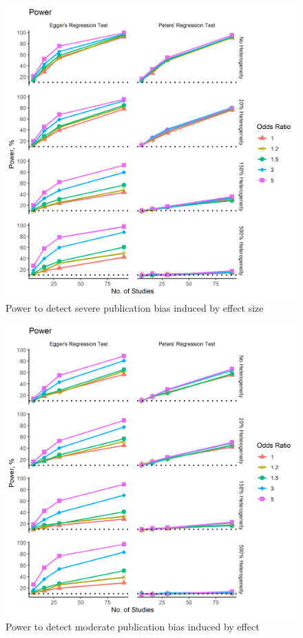 \documentclass[
  english,
  doc,floatsintext,draftall]{apa6}
\begin{document}
\begin{figure}
\includegraphics[width=400pt]{../figures/power_es_severe} \caption{Power to detect severe publication bias induced by effect size}\label{fig:unnamed-chunk-10}
\end{figure}

\begin{figure}
\includegraphics[width=400pt]{../figures/power_es_moderate} \caption{Power to detect moderate publication bias induced by effect}\label{fig:unnamed-chunk-11}
\end{figure}
\FloatBarrier
\end{document}
